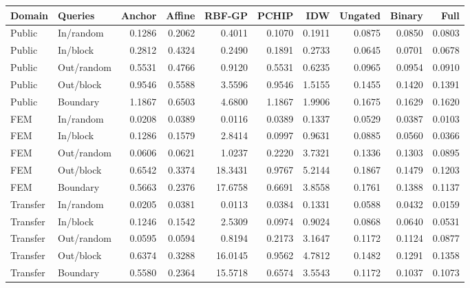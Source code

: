 \begin{tabular}{llrrrrrrrr}
\toprule
Domain & Queries & Anchor & Affine & RBF-GP & PCHIP & IDW & Ungated & Binary & Full \\
\midrule
Public & In/random & 0.1286 & 0.2062 & 0.4011 & 0.1070 & 0.1911 & 0.0875 & 0.0850 & 0.0803 \\
Public & In/block & 0.2812 & 0.4324 & 0.2490 & 0.1891 & 0.2733 & 0.0645 & 0.0701 & 0.0678 \\
Public & Out/random & 0.5531 & 0.4766 & 0.9120 & 0.5531 & 0.6235 & 0.0965 & 0.0954 & 0.0910 \\
Public & Out/block & 0.9546 & 0.5588 & 3.5596 & 0.9546 & 1.5155 & 0.1455 & 0.1420 & 0.1391 \\
Public & Boundary & 1.1867 & 0.6503 & 4.6800 & 1.1867 & 1.9906 & 0.1675 & 0.1629 & 0.1620 \\
FEM & In/random & 0.0208 & 0.0389 & 0.0116 & 0.0389 & 0.1337 & 0.0529 & 0.0387 & 0.0103 \\
FEM & In/block & 0.1286 & 0.1579 & 2.8414 & 0.0997 & 0.9631 & 0.0885 & 0.0560 & 0.0366 \\
FEM & Out/random & 0.0606 & 0.0621 & 1.0237 & 0.2220 & 3.7321 & 0.1336 & 0.1303 & 0.0895 \\
FEM & Out/block & 0.6542 & 0.3374 & 18.3431 & 0.9767 & 5.2144 & 0.1867 & 0.1479 & 0.1203 \\
FEM & Boundary & 0.5663 & 0.2376 & 17.6758 & 0.6691 & 3.8558 & 0.1761 & 0.1388 & 0.1137 \\
Transfer & In/random & 0.0205 & 0.0381 & 0.0113 & 0.0384 & 0.1331 & 0.0588 & 0.0432 & 0.0159 \\
Transfer & In/block & 0.1246 & 0.1542 & 2.5309 & 0.0974 & 0.9024 & 0.0868 & 0.0640 & 0.0531 \\
Transfer & Out/random & 0.0595 & 0.0594 & 0.8194 & 0.2173 & 3.1647 & 0.1172 & 0.1124 & 0.0877 \\
Transfer & Out/block & 0.6374 & 0.3288 & 16.0145 & 0.9562 & 4.7812 & 0.1482 & 0.1291 & 0.1358 \\
Transfer & Boundary & 0.5580 & 0.2364 & 15.5718 & 0.6574 & 3.5543 & 0.1172 & 0.1037 & 0.1073 \\
\bottomrule
\end{tabular}
